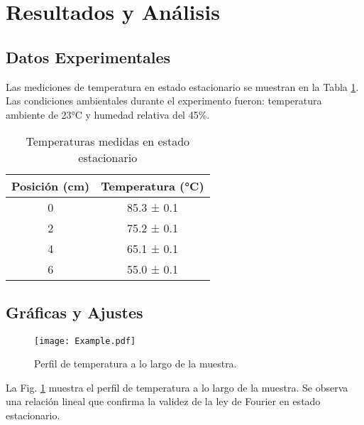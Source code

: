 \documentclass[9pt,a4paper,twocolumn,twoside]{lab-class/lab}
\begin{document}
\section{Resultados y Análisis}
    \subsection{Datos Experimentales}

        Las mediciones de temperatura en estado estacionario se muestran en la Tabla \ref{tab:temperaturas}. Las condiciones ambientales durante el experimento fueron: temperatura ambiente de 23°C y humedad relativa del 45\%.

        \begin{table}[H]
            \centering
            \caption{Temperaturas medidas en estado estacionario}
            \label{tab:temperaturas}
            \begin{tabular}{cc}
                \toprule
                \textbf{Posición (cm)} & \textbf{Temperatura (°C)} \\
                \midrule
                0 & 85.3 ± 0.1 \\
                2 & 75.2 ± 0.1 \\
                4 & 65.1 ± 0.1 \\
                6 & 55.0 ± 0.1 \\
                \bottomrule
            \end{tabular}
        \end{table}

    \subsection{Gráficas y Ajustes}

        \begin{figure}[H]
            \centering
            \texttt{[image: Example.pdf]}
            \caption{Perfil de temperatura a lo largo de la muestra.}
            \label{fig:gradiente}
        \end{figure}

        La Fig. \ref{fig:gradiente} muestra el perfil de temperatura a lo largo de la muestra. Se observa una relación lineal que confirma la validez de la ley de Fourier en estado estacionario.
\end{document}
